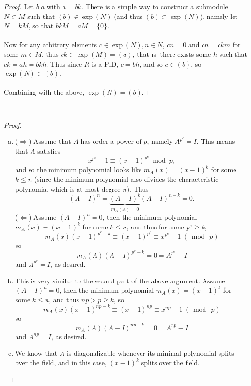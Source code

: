 \documentclass{article}
\newenvironment{problem}[2][Problem]{\begin{trivlist}
\item[\hskip \labelsep {\bfseries #1}\hskip \labelsep {\bfseries #2.}]}{\end{trivlist}}
\newcommand{\set}[1]{\{ #1 \}}
\begin{document}
\begin{proof}
  Let $b | a$ with $a = bk$.
  There is a simple way to construct a submodule $N \subset M$ such that
  $(b) \in \exp(N)$ (and thus $(b) \subset \exp(N)$), namely let $N = kM$, so
  that $bkM = aM = \set 0$.
  \\~\\
  Now for any arbitrary elements $c \in \exp(N), n \in N$, $cn = 0$ and
  $cn = ckm$ for some $m \in M$, thus $ck \in \exp(M) = (a)$, that is, there
  exists some $h$ such that $ck = ah = bkh$. Thus since $R$ is a PID, $c = bh$, and
  so $c \in (b)$, so $\exp(N) \subset (b)$.
  \\~\\
  Combining with the above, $\exp(N) = (b)$.
\end{proof}
\pagebreak
\begin{problem}{4} ~
\end{problem}

\begin{proof} ~
  \begin{enumerate}[(a)]
    \item ($\Longrightarrow$) Assume that $A$ has order a power of $p$, namely
    $A^{p^e} = I$. This means that $A$ satisfies \[
      x^{p^e} - 1 \equiv (x - 1)^{p^e} \bmod p,
    \] and so the minimum polynomial looks like $m_A(x) = (x-1)^k$ for some $k \leq n$
    (since the minimum polynomial also divides the characteristic polynomial
    which is at most degree $n$). Thus \[
      (A - I)^n = \underbrace{(A - I)^k}_{m_A(A) = 0}(A - I)^{n-k} = 0.
    \]
    ($\Longleftarrow$) Assume $(A - I)^n = 0$, then the minimum polynomial
    $m_A(x) = (x-1)^k$ for some $k \leq n$, and thus for some $p^e \geq k$, \[
      m_A(x) (x-1)^{p^e - k} \equiv (x-1)^{p^e} \equiv x^{p^e} - 1\ (\bmod\ p)
    \] so \[
      m_A(A) (A-I)^{p^e - k} = 0 = A^{p^e} - I
    \] and $A^{p^e} = I$, as desired.
    \item This is very similar to the second part of the above argument.
    Assume $(A - I)^n = 0$, then the minimum polynomial
    $m_A(x) = (x-1)^k$ for some $k \leq n$, and thus $np > p \geq k$, so \[
      m_A(x) (x-1)^{np - k} \equiv (x-1)^{np} \equiv x^{np} - 1\ (\bmod\ p)
    \] so \[
      m_A(A) (A-I)^{np - k} = 0 = A^{np} - I
    \] and $A^{np} = I$, as desired.
    \item We know that $A$ is diagonalizable whenever its minimal polynomial
    splits over the field, and in this case, $(x-1)^k$ splits over the field.
  \end{enumerate}
\end{proof}
\end{document}
